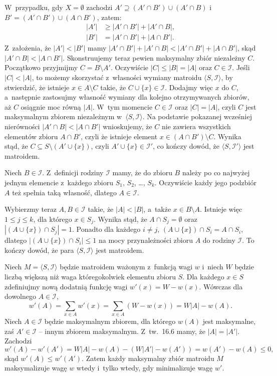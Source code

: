 W~przypadku, gdy $X=\emptyset$ zachodzi $A'\supseteq(A'\cap B')\cup(A'\cap B)$ i~$B'=(A'\cap B')\cup(A\cap B')$, zatem:
\begin{align*}
	|A'| &\ge |A'\cap B'|+|A'\cap B|, \\
	|B'| &= |A'\cap B'|+|A\cap B'|.
\end{align*}
Z~założenia, że $|A'|<|B'|$ mamy $|A'\cap B'|+|A'\cap B|<|A'\cap B'|+|A\cap B'|$, skąd $|A'\cap B|<|A\cap B'|$.
Skonstruujemy teraz pewien maksymalny zbiór niezależny $C$.
Początkowo przyjmijmy $C=B\setminus A'$.
Oczywiście $|C|\le|B|=|A|$ oraz $C\in\mathcal{I}$.
Jeśli $|C|<|A|$, to możemy skorzystać z~własności wymiany matroidu $\langle S,\mathcal{I}\rangle$, by stwierdzić, że istnieje $x\in A\setminus C$ takie, że $C\cup\{x\}\in\mathcal{I}$.
Dodajmy więc $x$ do $C$, a~następnie zastosujmy własność wymiany dla kolejno otrzymywanych zbiorów, aż $C$ osiągnie moc równą $|A|$.
W~tym momencie $C\in\mathcal{I}$ oraz $|C|=|A|$, czyli $C$ jest maksymalnym zbiorem niezależnym w~$\langle S,\mathcal{I}\rangle$.
Na podstawie pokazanej wcześniej nierówności $|A'\cap B|<|A\cap B'|$ wnioskujemy, że $C$ nie zawiera wszystkich elementów zbioru $A\cap B'$, czyli że istnieje element $x\in(A\cap B')\setminus C$.
Wynika stąd, że $C\subseteq S\setminus(A'\cup\{x\})$, czyli $A'\cup\{x\}\in\mathcal{I}'$, co kończy dowód, że $\langle S,\mathcal{I}'\rangle$ jest matroidem.

\exercise %
Niech $B\in\mathcal{I}$.
Z~definicji rodziny $\mathcal{I}$ mamy, że do zbioru $B$ należy po co najwyżej jednym elemencie z~każdego zbioru $S_1$, $S_2$, \dots, $S_k$.
Oczywiście każdy jego podzbiór $A$ też spełnia taką własność, dlatego $A\in\mathcal{I}$.

Wybierzmy teraz $A,B\in\mathcal{I}$ takie, że $|A|<|B|$, a~także $x\in B\setminus A$.
Istnieje więc $1\le j\le k$, dla którego $x\in S_j$.
Wynika stąd, że $A\cap S_j=\emptyset$ oraz $|(A\cup\{x\})\cap S_j|=1$.
Ponadto dla każdego $i\ne j$, $(A\cup\{x\})\cap S_i=A\cap S_i$, dlatego $|(A\cup\{x\})\cap S_i|\le1$ na mocy przynależności zbioru $A$ do rodziny $\mathcal{I}$.
To kończy dowód, że para $\langle S,\mathcal{I}\rangle$ jest matroidem.

\exercise %
Niech $M=\langle S,\mathcal{I}\rangle$ będzie matroidem ważonym z~funkcją wagi $w$ i~niech $W$ będzie liczbą większą niż waga któregokolwiek elementu zbioru $S$.
Dla każdego $x\in S$ zdefiniujmy nową dodatnią funkcję wagi $w'(x)=W-w(x)$.
Wówczas dla dowolnego $A\in\mathcal{I}$,
\[
	w'(A) = \sum_{x\in A}w'(x) = \sum_{x\in A}(W-w(x)) = W|A|-w(A).
\]
Niech $A\in\mathcal{I}$ będzie maksymalnym zbiorem, dla którego $w(A)$ jest maksymalne, zaś $A'\in\mathcal{I}$ -- innym zbiorem maksymalnym.
Z~tw.\ 16.6 mamy, że $|A|=|A'|$.
Zachodzi
\[
	w'(A)-w'(A') = W|A|-w(A)-(W|A'|-w(A')) = w(A')-w(A) \le 0,
\]
skąd $w'(A)\le w'(A')$.
Zatem każdy maksymalny zbiór matroidu $M$ maksymalizuje wagę $w$ wtedy i~tylko wtedy, gdy minimalizuje wagę $w'$.
